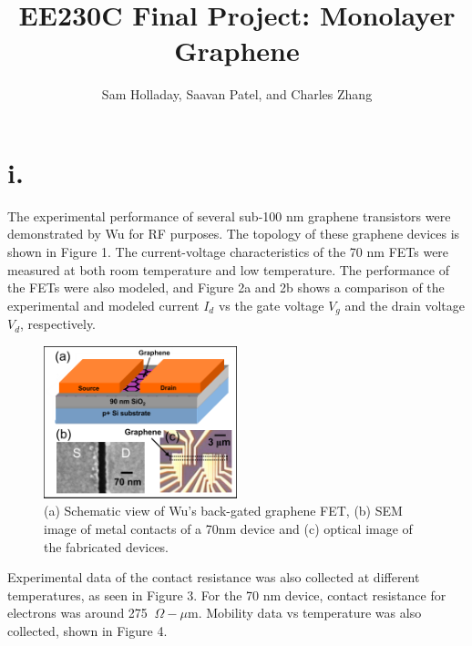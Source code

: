 \documentclass[11pt]{article}
\title{EE230C Final Project: Monolayer Graphene}
\author{Sam Holladay, Saavan Patel, and Charles Zhang}
\date{}
\begin{document}
\maketitle

\section*{i.} The experimental performance of several sub-100 nm graphene transistors were demonstrated by Wu for RF purposes\cite{wu2010}. The topology of these graphene devices is shown in Figure 1. The current-voltage characteristics of the 70 nm FETs were measured at both room temperature and low temperature. The performance of the FETs were also modeled, and Figure 2a and 2b shows a comparison of the experimental and modeled current $I_d$ vs the gate voltage $V_g$ and the drain voltage $V_d$, respectively. 
\begin{figure}[h!]
\centering 
\includegraphics[width=0.5\textwidth]{paper1_fet.png}
\caption{(a) Schematic view of Wu's back-gated graphene FET, (b) SEM image of metal contacts of a 70nm device and (c) optical image of the fabricated devices.}\label{fig:FET}
\end{figure}

Experimental data of the contact resistance was also collected at different temperatures, as seen in Figure 3. For the 70 nm device, contact resistance for electrons was around 275 $~\Omega -\mu$m. Mobility data vs temperature was also collected, shown in Figure 4.
\end{document}
